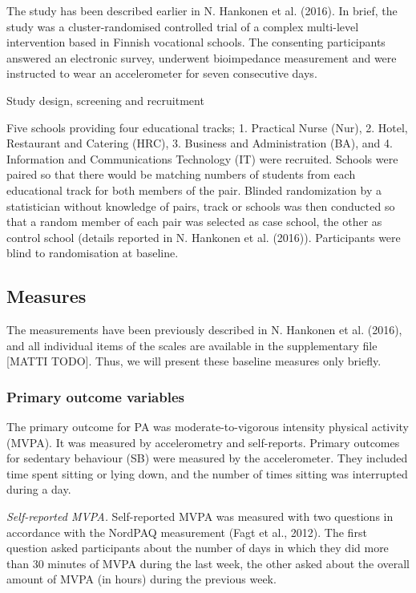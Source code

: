 \documentclass[english,floatsintext,]{apa6}
\theoremstyle{definition}
\theoremstyle{definition}
\theoremstyle{definition}
\theoremstyle{remark}
\begin{document}
The study has been described earlier in N. Hankonen et al. (2016). In
brief, the study was a cluster-randomised controlled trial of a complex
multi-level intervention based in Finnish vocational schools. The
consenting participants answered an electronic survey, underwent
bioimpedance measurement and were instructed to wear an accelerometer
for seven consecutive days.

Study design, screening and recruitment

Five schools providing four educational tracks; 1. Practical Nurse
(Nur), 2. Hotel, Restaurant and Catering (HRC), 3. Business and
Administration (BA), and 4. Information and Communications Technology
(IT) were recruited. Schools were paired so that there would be matching
numbers of students from each educational track for both members of the
pair. Blinded randomization by a statistician without knowledge of
pairs, track or schools was then conducted so that a random member of
each pair was selected as case school, the other as control school
(details reported in N. Hankonen et al. (2016)). Participants were blind
to randomisation at baseline.

\subsection{Measures}\label{measures}

The measurements have been previously described in N. Hankonen et al.
(2016), and all individual items of the scales are available in the
supplementary file {[}MATTI TODO{]}. Thus, we will present these
baseline measures only briefly.

\subsubsection{Primary outcome
variables}\label{primary-outcome-variables}

The primary outcome for PA was moderate-to-vigorous intensity physical
activity (MVPA). It was measured by accelerometry and self-reports.
Primary outcomes for sedentary behaviour (SB) were measured by the
accelerometer. They included time spent sitting or lying down, and the
number of times sitting was interrupted during a day.

\emph{Self-reported MVPA.} Self-reported MVPA was measured with two
questions in accordance with the NordPAQ measurement (Fagt et al.,
2012). The first question asked participants about the number of days in
which they did more than 30 minutes of MVPA during the last week, the
other asked about the overall amount of MVPA (in hours) during the
previous week.
\end{document}
